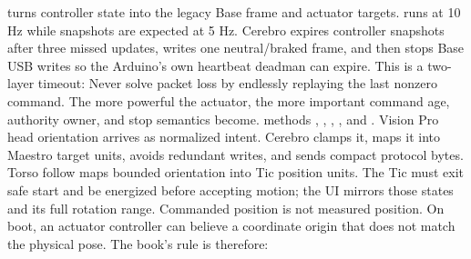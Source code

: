 {}
\markdownRendererSectionEnd \markdownRendererSectionBegin
{}\markdownRendererInterblockSeparator
{} turns controller state into the legacy Base frame and actuator targets.  runs at 10 Hz while snapshots are expected at 5 Hz. Cerebro expires controller snapshots after three missed updates, writes one neutral/braked frame, and then stops Base USB writes so the Arduino's own heartbeat deadman can expire.\markdownRendererParagraphSeparator
{}This is a two-layer timeout:\markdownRendererInterblockSeparator
{}\markdownRendererInterblockSeparator
{}Never solve packet loss by endlessly replaying the last nonzero command. The more powerful the actuator, the more important command age, authority owner, and stop semantics become.\markdownRendererInterblockSeparator
{}
\markdownRendererSectionEnd \markdownRendererSectionBegin
{}\markdownRendererInterblockSeparator
{}\markdownRendererBlockQuoteBegin
{}  methods , , , , and .\markdownRendererBlockQuoteEnd \markdownRendererInterblockSeparator
{}Vision Pro head orientation arrives as normalized intent. Cerebro clamps it, maps it into Maestro target units, avoids redundant writes, and sends compact protocol bytes. Torso follow maps bounded orientation into Tic position units. The Tic must exit safe start and be energized before accepting motion; the UI mirrors those states and its full rotation range.\markdownRendererParagraphSeparator
{}Commanded position is not measured position. On boot, an actuator controller can believe a coordinate origin that does not match the physical pose. The book's rule is therefore:\markdownRendererInterblockSeparator
{}\markdownRendererInterblockSeparator
